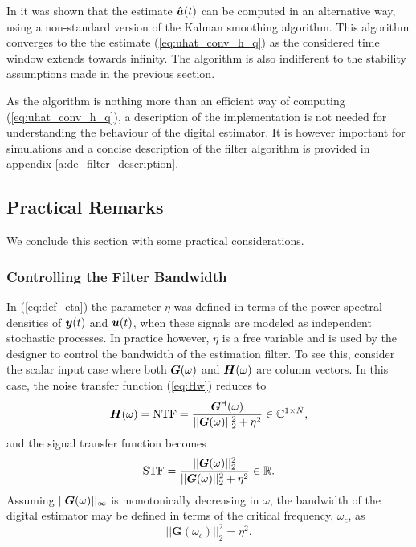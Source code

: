 In \cite{cbc_2011_loeliger} it was shown that the estimate $\hat{\bm{u}}(t)$ can be computed in an alternative way, using a non-standard version of the Kalman smoothing algorithm. This algorithm converges to the the estimate (\ref{eq:uhat_conv_h_q}) as the considered time window extends towards infinity. The algorithm is also indifferent to the stability assumptions made in the previous section.

As the algorithm is nothing more than an efficient way of computing (\ref{eq:uhat_conv_h_q}), a description of the implementation is not needed for understanding the behaviour of the digital estimator. It is however important for simulations and a concise description of the filter algorithm is provided in appendix \ref{a:de_filter_description}.


\subsection{Practical Remarks}
\label{sec:practical_remarks}
We conclude this section with some practical considerations.

\subsubsection*{Controlling the Filter Bandwidth}
In (\ref{eq:def_eta}) the parameter $\eta$ was defined in terms of the power spectral densities of $\bm{y}(t)$ and $\bm{u}(t)$, when these signals are modeled as independent stochastic processes. In practice however, $\eta$ is a free variable and is used by the designer to control the bandwidth of the estimation filter. To see this, consider the scalar input case where both $\bm{G}(\omega)$ and $\bm{H}(\omega)$ are column vectors. In this case, the noise transfer function (\ref{eq:Hw}) reduces to
\begin{equation}
    \label{eq:atf_scalar}
    \bm{H}(\omega) = \text{NTF} = \frac{\bm{G}^\mathsf{H}(\omega)}{||\bm{G}(\omega)||_2^2 + \eta^2} \in \mathbb{C}^{1 \times \tilde{N}},
\end{equation}
and the signal transfer function becomes
\begin{equation}
    \label{eq:stf_scalar}
    \text{STF} = \frac{||\bm{G}(\omega)||_2^2}{||\bm{G}(\omega)||_2^2 + \eta^2} \in \mathbb{R}.
\end{equation}
Assuming $||\bm{G}(\omega)||_{\infty}$ is monotonically decreasing in $\omega$, the bandwidth of the digital estimator may be defined in terms of the critical frequency, $\omega_{c}$, as
\begin{equation}
    \label{eq:def_BW}
    ||\bm{G}(\omega_c)||_2^2 = \eta^2.
\end{equation}


